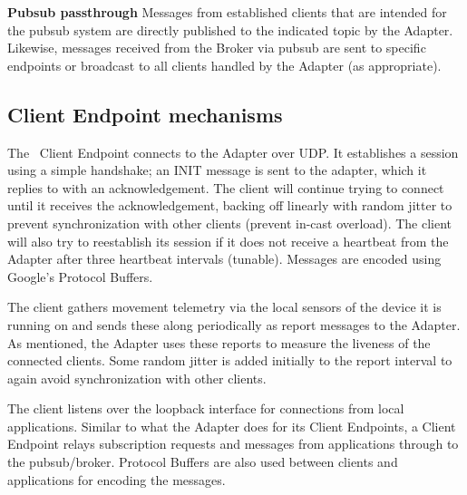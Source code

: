 \textbf{Pubsub passthrough} Messages from established clients that are
intended for the pubsub system are directly published to the indicated
topic by the Adapter. Likewise, messages received from the Broker via
pubsub are sent to specific endpoints or broadcast to all clients
handled by the Adapter (as appropriate).
    
\subsection{Client Endpoint mechanisms}

The \name~Client Endpoint connects to the Adapter over UDP. It
establishes a session using a simple handshake; an INIT message is
sent to the adapter, which it replies to with an acknowledgement. The
client will continue trying to connect until it receives the
acknowledgement, backing off linearly with random jitter to prevent
synchronization with other clients (prevent in-cast overload). The
client will also try to reestablish its session if it does not receive
a heartbeat from the Adapter after three heartbeat intervals (tunable).
Messages are encoded using Google's Protocol Buffers.

The client gathers movement telemetry via the local sensors of the
device it is running on and sends these along periodically as report
messages to the Adapter.  As mentioned, the Adapter uses these reports
to measure the liveness of the connected clients.  Some random jitter
is added initially to the report interval to again avoid
synchronization with other clients.

The client listens over the loopback interface for connections from
local applications.  Similar to what the Adapter does for its Client
Endpoints, a Client Endpoint relays subscription requests and messages
from applications through to the pubsub/broker.  Protocol Buffers are
also used between clients and applications for encoding the messages.

% 
%

